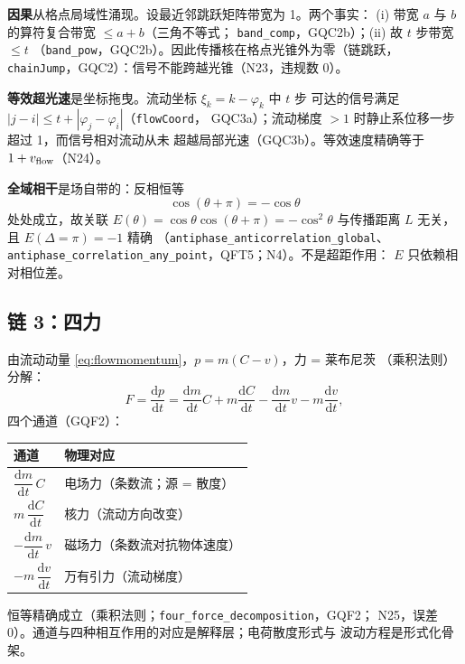 \documentclass[aps,prd,preprint,superscriptaddress,amsmath,amssymb]{revtex4-2}
\begin{document}
\textbf{因果}从格点局域性涌现。设最近邻跳跃矩阵带宽为 1。两个事实：
(i) 带宽 $a$ 与 $b$ 的算符复合带宽 $\le a+b$（三角不等式；
\texttt{band\_comp}，GQC2b）；(ii) 故 $t$ 步带宽 $\le t$
（\texttt{band\_pow}，GQC2b）。因此传播核在格点光锥外为零（链跳跃，
\texttt{chainJump}，GQC2）：信号不能跨越光锥（N23，违规数 0）。

\textbf{等效超光速}是坐标拖曳。流动坐标 $\xi_k=k-\varphi_k$ 中 $t$ 步
可达的信号满足 $|j-i|\le t+|\varphi_j-\varphi_i|$（\texttt{flowCoord}，
GQC3a）；流动梯度 $>1$ 时静止系位移一步超过 1，而信号相对流动从未
超越局部光速（GQC3b）。等效速度精确等于 $1+v_{\rm flow}$（N24）。

\textbf{全域相干}是场自带的：反相恒等
\begin{equation}
\cos(\theta+\pi)=-\cos\theta
\label{eq:antiphase}
\end{equation}
处处成立，故关联 $E(\theta)=\cos\theta\cos(\theta+\pi)=-\cos^2\theta$
与传播距离 $L$ 无关，且 $E(\Delta=\pi)=-1$ 精确
（\texttt{antiphase\_anticorrelation\_global}、
\texttt{antiphase\_correlation\_any\_point}，QFT5；N4）。不是超距作用：
$E$ 只依赖相对相位差。

\subsection{链 3：四力}
\label{app:chain3}

由流动动量 \eqref{eq:flowmomentum}，$p=m(C-v)$，力 = 莱布尼茨
（乘积法则）分解：
\begin{equation}
F=\frac{\mathrm dp}{\mathrm dt}
=\frac{\mathrm dm}{\mathrm dt}C
+m\frac{\mathrm dC}{\mathrm dt}
-\frac{\mathrm dm}{\mathrm dt}v
-m\frac{\mathrm dv}{\mathrm dt},
\label{eq:fourforces}
\end{equation}
四个通道（GQF2）：
\begin{center}
\begin{tabular}{ll}
\toprule
通道 & 物理对应 \\
\midrule
$\dfrac{\mathrm dm}{\mathrm dt}\,C$ & 电场力（条数流；源 = 散度） \\
$m\,\dfrac{\mathrm dC}{\mathrm dt}$ & 核力（流动方向改变） \\
$-\dfrac{\mathrm dm}{\mathrm dt}\,v$ & 磁场力（条数流对抗物体速度） \\
$-m\,\dfrac{\mathrm dv}{\mathrm dt}$ & 万有引力（流动梯度） \\
\bottomrule
\end{tabular}
\end{center}
恒等精确成立（乘积法则；\texttt{four\_force\_decomposition}，GQF2；
N25，误差 0）。通道与四种相互作用的对应是解释层；电荷散度形式与
波动方程是形式化骨架。
\end{document}
